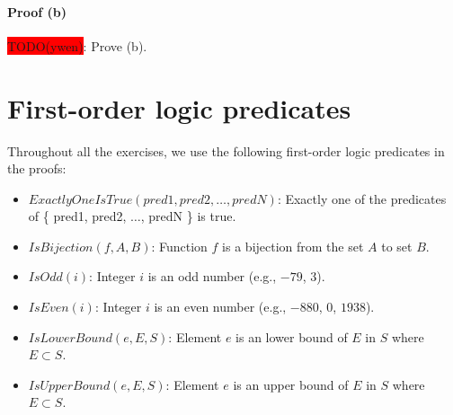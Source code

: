 \documentclass[12pt, letterpaper, oneside]{book}
\begin{document}
\subsubsection{Proof (b)}

\colorbox{red}{TODO(ywen)}: Prove (b).

%
%

\chapter{First-order logic predicates}

Throughout all the exercises, we use the following first-order logic predicates in the proofs:

\begin{itemize}
  \item $ExactlyOneIsTrue(pred1, pred2, \ldots, predN)$: Exactly one of the predicates of \{ pred1, pred2, $\ldots$,
        predN \} is true.
  \item $IsBijection(f, A, B)$: Function $f$ is a bijection from the set $A$ to set $B$.
  \item $IsOdd(i)$: Integer $i$ is an odd number (e.g., $-79$, $3$).
  \item $IsEven(i)$: Integer $i$ is an even number (e.g., $-880$, $0$, $1938$).
  \item $IsLowerBound(e, E, S)$: Element $e$ is an lower bound of $E$ in $S$ where $E \subset S$.
  \item $IsUpperBound(e, E, S)$: Element $e$ is an upper bound of $E$ in $S$ where $E \subset S$.
\end{itemize}
\end{document}
